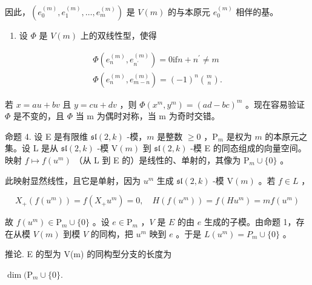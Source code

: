 因此，\((e_0^{(m)}, e_1^{(m)}, \ldots, e_m^{(m)})\) 是 \(V(m)\) 的与本原元 \(e_0^{(m)}\) 相伴的基。

\begin{enumerate}
\def\labelenumi{\arabic{enumi})}
\setcounter{enumi}{2}
\tightlist
\item
  设 \(\Phi\) 是 \(V(m)\) 上的双线性型，使得
\end{enumerate}

\[
\begin{array}{c} \varPhi (e _ {n} ^ {(m)}, e _ {n ^ {\prime}} ^ {(m)}) = 0 \text {if} n + n ^ {\prime} \neq m \\ \varPhi (e _ {n} ^ {(m)}, e _ {m - n} ^ {(m)}) = (- 1) ^ {n} \binom {m} {n}. \end{array}
\]

若 \(x = au + bv\) 且 \(y = cu + dv\) ，则 \(\Phi(x^{m}, y^{m}) = (ad - bc)^{m}\) 。现在容易验证 \(\Phi\) 是不变的，且 \(\Phi\) 当 m 为偶时对称，当 m 为奇时交错。

命题 4. 设 E 是有限维 \(\mathfrak{sl}(2,k)\) -模，\(m\) 是整数 \(\geq 0\) ，\(\mathrm{P}_m\) 是权为 \(m\) 的本原元之集。设 L 是从 \(\mathfrak{sl}(2,k)\) -模 \(\mathrm{V}(m)\) 到 \(\mathfrak{sl}(2,k)\) -模 E 的同态组成的向量空间。映射 \(f \mapsto f(u^m)\) （从 L 到 E 的）是线性的、单射的，其像为 \(\mathrm{P}_m \cup \{0\}\) 。

此映射显然线性，且它是单射，因为 \(u^{m}\) 生成 \(\mathfrak{sl}(2,k)\) -模 \(\mathrm{V}(m)\) 。若 \(f \in L\) ，

\[
X _ {+} (f (u ^ {m})) = f (X _ {+} u ^ {m}) = 0, \quad H (f (u ^ {m})) = f (H u ^ {m}) = m f (u ^ {m})
\]

故 \(f(u^{m}) \in \mathrm{P}_{m} \cup \{0\}\) 。设 \(e \in \mathrm{P}_{m}\) ，\(V\) 是 \(E\) 的由 \(e\) 生成的子模。由命题 1，存在从模 \(V(m)\) 到模 \(V\) 的同构，把 \(u^{m}\) 映到 \(e\) 。于是 \(L(u^{m}) = P_{m} \cup \{0\}\) 。

推论. E 的型为 V(m) 的同构型分支的长度为

\(\dim (\mathrm{P}_m\cup \{0\} .\)

